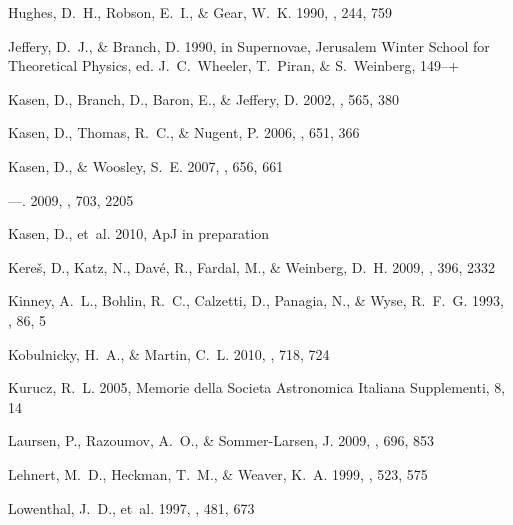\documentclass[12pt,preprint]{aastex}
\begin{document}
\begin{thebibliography}{74}
{Hughes}, D.~H., {Robson}, E.~I., \& {Gear}, W.~K. 1990, \mnras, 244, 759

{Jeffery}, D.~J., \& {Branch}, D. 1990, in Supernovae, Jerusalem Winter School
  for Theoretical Physics, ed. {J.~C.~Wheeler, T.~Piran, \& S.~Weinberg},
  149--+

{Kasen}, D., {Branch}, D., {Baron}, E., \& {Jeffery}, D. 2002, \apj, 565, 380

{Kasen}, D., {Thomas}, R.~C., \& {Nugent}, P. 2006, \apj, 651, 366

{Kasen}, D., \& {Woosley}, S.~E. 2007, \apj, 656, 661

---. 2009, \apj, 703, 2205

{Kasen}, D., {et~al.} 2010, ApJ in preparation

{Kere{\v s}}, D., {Katz}, N., {Dav{\'e}}, R., {Fardal}, M., \& {Weinberg},
  D.~H. 2009, \mnras, 396, 2332

{Kinney}, A.~L., {Bohlin}, R.~C., {Calzetti}, D., {Panagia}, N., \& {Wyse},
  R.~F.~G. 1993, \apjs, 86, 5

{Kobulnicky}, H.~A., \& {Martin}, C.~L. 2010, \apj, 718, 724

{Kurucz}, R.~L. 2005, Memorie della Societa Astronomica Italiana Supplementi,
  8, 14

{Laursen}, P., {Razoumov}, A.~O., \& {Sommer-Larsen}, J. 2009, \apj, 696, 853

{Lehnert}, M.~D., {Heckman}, T.~M., \& {Weaver}, K.~A. 1999, \apj, 523, 575

{Lowenthal}, J.~D., {et~al.} 1997, \apj, 481, 673


\end{thebibliography}
\end{document}
